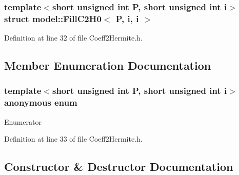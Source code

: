 \subsubsection*{template$<$short unsigned int P, short unsigned int i$>$struct model\+::\+Fill\+C2\+H0$<$ P, i, i $>$}



Definition at line 32 of file Coeff2\+Hermite.\+h.



\subsection{Member Enumeration Documentation}
\hypertarget{structmodel_1_1_fill_c2_h0_3_01_p_00_01i_00_01i_01_4_aedab7860c338b6226812e5af71541599}{}\subsubsection[{anonymous enum}]{\setlength{\rightskip}{0pt plus 5cm}template$<$short unsigned int P, short unsigned int i$>$ anonymous enum}\label{structmodel_1_1_fill_c2_h0_3_01_p_00_01i_00_01i_01_4_aedab7860c338b6226812e5af71541599}
\begin{Desc}
\item[Enumerator]\par
\begin{description}
\item[{\em 
\hypertarget{structmodel_1_1_fill_c2_h0_3_01_p_00_01i_00_01i_01_4_aedab7860c338b6226812e5af71541599ad44b9c85ef11d9300443d2077712c186}{}j\label{structmodel_1_1_fill_c2_h0_3_01_p_00_01i_00_01i_01_4_aedab7860c338b6226812e5af71541599ad44b9c85ef11d9300443d2077712c186}
}]\end{description}
\end{Desc}


Definition at line 33 of file Coeff2\+Hermite.\+h.



\subsection{Constructor \& Destructor Documentation}
\hypertarget{structmodel_1_1_fill_c2_h0_3_01_p_00_01i_00_01i_01_4_ad4d60c1b192d6f4c8c130f9db67be25f}{}
